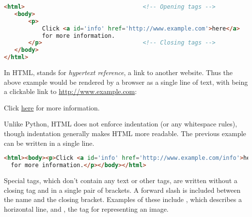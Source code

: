 \begin{lstlisting}[language=HTML]
<html>                                  <!-- Opening tags -->
   <body>
       <p>
           Click <a id='info' href='http://www.example.com'>here</a>
           for more information.
       </p>                             <!-- Closing tags -->
   </body>
</html>
\end{lstlisting}

In HTML,  stands for \emph{hypertext reference}, a link to another website.
Thus the above example would be rendered by a browser as a single line of text, with  being a clickable link to \url{http://www.example.com}:

\begin{center}
Click \href{http://www.example.com}{here} for more information.
\end{center}

Unlike Python, HTML does not enforce indentation (or any whitespace rules), though indentation generally makes HTML more readable.
The previous example can be written in a single line.

\begin{lstlisting}[language=HTML]
<html><body><p>Click <a id='info' href='http://www.example.com/info'>here</a>
  for more information.</p></body></html>
\end{lstlisting}

Special tags, which don't contain any text or other tags, are written without a closing tag and in a single pair of brackets.
A forward slash is included between the name and the closing bracket.
Examples of these include , which describes a horizontal line, and , the tag for representing an image.
\begin{comment}
\begin{problem} %
Using the output from Problem \ref{prob:get-example.com}, examine the HTML source code for \url{http://www.example.com}.
What tags are used?
What is the value of the \li{<<type>>} attribute associated with the \li{style} tag?

Write a function that returns a set of the names of all tags the website uses and the value of the \li{<<type>>} attribute of the \li{style} tag (as a string). 
\\(Hint: there are ten unique tag names.)
\label{prob:look-at-example.com}
\end{problem}
\end{comment}

